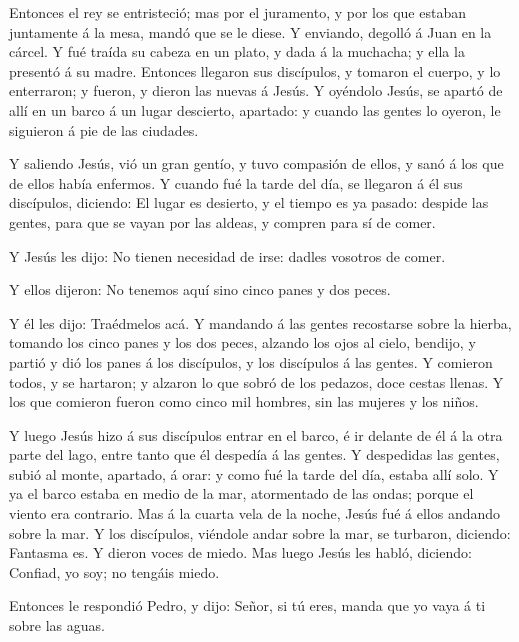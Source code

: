  Entonces el rey se entristeció; mas por el juramento, y por
los que estaban juntamente á la mesa, mandó que se le diese.
 Y enviando, degolló á Juan en la cárcel.  Y
fué traída su cabeza en un plato, y dada á la muchacha; y ella la
presentó á su madre.  Entonces llegaron sus discípulos, y
tomaron el cuerpo, y lo enterraron; y fueron, y dieron las nuevas á
Jesús.  Y oyéndolo Jesús, se apartó de allí en un barco á
un lugar descierto, apartado: y cuando las gentes lo oyeron, le
siguieron á pie de las ciudades.

 Y saliendo Jesús, vió un gran gentío, y tuvo compasión de
ellos, y sanó á los que de ellos había enfermos.  Y cuando
fué la tarde del día, se llegaron á él sus discípulos, diciendo: El
lugar es desierto, y el tiempo es ya pasado: despide las gentes, para
que se vayan por las aldeas, y compren para sí de comer.

 Y Jesús les dijo: No tienen necesidad de irse: dadles
vosotros de comer.

 Y ellos dijeron: No tenemos aquí sino cinco panes y dos
peces.

 Y él les dijo: Traédmelos acá.  Y mandando á
las gentes recostarse sobre la hierba, tomando los cinco panes y los dos
peces, alzando los ojos al cielo, bendijo, y partió y dió los panes á
los discípulos, y los discípulos á las gentes.  Y comieron
todos, y se hartaron; y alzaron lo que sobró de los pedazos, doce cestas
llenas.  Y los que comieron fueron como cinco mil hombres,
sin las mujeres y los niños.

 Y luego Jesús hizo á sus discípulos entrar en el barco, é
ir delante de él á la otra parte del lago, entre tanto que él despedía á
las gentes.  Y despedidas las gentes, subió al monte,
apartado, á orar: y como fué la tarde del día, estaba allí solo.
 Y ya el barco estaba en medio de la mar, atormentado de
las ondas; porque el viento era contrario.  Mas á la cuarta
vela de la noche, Jesús fué á ellos andando sobre la mar. 
Y los discípulos, viéndole andar sobre la mar, se turbaron, diciendo:
Fantasma es. Y dieron voces de miedo.  Mas luego Jesús les
habló, diciendo: Confiad, yo soy; no tengáis miedo.

 Entonces le respondió Pedro, y dijo: Señor, si tú eres,
manda que yo vaya á ti sobre las aguas.

